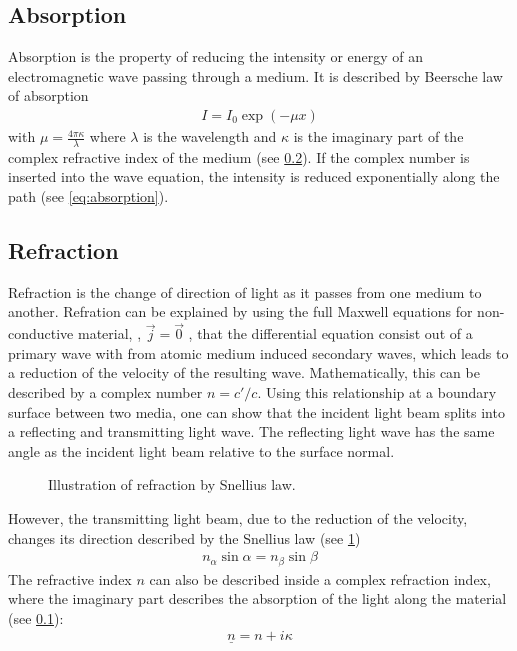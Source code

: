 \subsection{Absorption}\label{sec:theoAbsorption}
%
Absorption is the property of reducing the intensity or energy of an electromagnetic wave passing through a medium.
It is described by Beersche law of absorption
% 
\begin{align} 
    I = I_0 \exp(-\mu x) \label{eq:absorption}
\end{align}
%
with $\mu = \frac{4\pi \kappa}{\lambda}$ where $\lambda$ is the wavelength and $\kappa$ is the imaginary part of the complex refractive index of the medium (see \cref{sec:theoRefraction}).
If the complex number is inserted into the wave equation, the intensity is reduced exponentially along the path (see \cref{eq:absorption}).
%
% 
% 
\subsection{Refraction}\label{sec:theoRefraction}
%
Refraction is the change of direction of light as it passes from one medium to another.
Refration can be explained by using the full Maxwell equations for non-conductive material, \ie{}, $\vec{j} = \vec{0}$ , that the differential equation consist out of a primary wave with from atomic medium induced secondary waves, which leads to a reduction of the velocity of the resulting wave.
Mathematically, this can be described by a complex number $n = c' / c$.
Using this relationship at a boundary surface between two media, one can show that the incident light beam splits into a reflecting and transmitting light wave.
The reflecting light wave has the same angle as the incident light beam relative to the surface normal.
%
\begin{figure}[!t]
\centering
\setlength{\tikzwidth}{\textwidth}
\caption{Illustration of refraction by Snellius law.}
\label{fig:optic_refraction}
\end{figure}
% 
However, the transmitting light beam, due to the reduction of the velocity, changes its direction described by the Snellius law (see \cref{fig:optic_refraction})
\begin{align}
    n_\alpha \sin \alpha = n_\beta \sin \beta \label{eq:Snellius}
\end{align}
% 
The refractive index $n$ can also be described inside a complex refraction index, where the imaginary part describes the absorption of the light along the material (see \cref{sec:theoAbsorption}):
% 
\begin{align}
\underline{n} = n + i\kappa
\end{align}
% 
%
%
